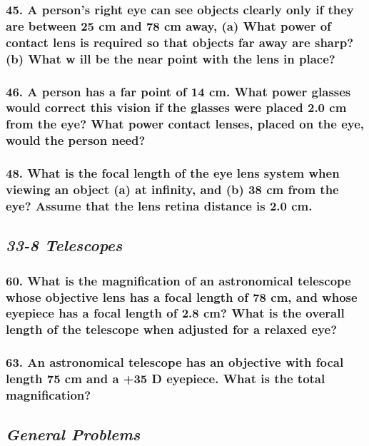 \documentclass{article}
\begin{document}
\subsubsection*{
    45. A person’s right eye can see objects clearly only if they are between 25 cm and 78 cm away, (a) What
    power of contact lens is required so that objects far away are sharp? (b) What w ill be the near point
    with the lens in place? 
}
\subsubsection*{
    46. A person has a far point of 14 cm. What power glasses would correct this vision if the glasses were
    placed 2.0 cm from the eye? What power contact lenses, placed on the eye, would the person need?
}
\subsubsection*{
    48. What is the focal length of the eye lens system when viewing an object (a) at infinity, and (b) 38 cm
    from the eye? Assume that the lens retina distance is 2.0 cm.
}
\newpage
\begin{center}
    \subsection*{\textbf{\textit{33-8 Telescopes}}}
\end{center}
\subsubsection*{
    60. What is the magnification of an astronomical telescope whose objective lens has a focal length of 78 cm,
    and whose eyepiece has a focal length of 2.8 cm? What is the overall length of the telescope when adjusted
    for a relaxed eye?
}
\subsubsection*{
    63. An astronomical telescope has an objective with focal length 75 cm and a +35 D eyepiece. What is the
    total magnification?
}
\newpage
\begin{center}
    \subsection*{\textbf{\textit{General Problems}}}
\end{center}
\end{document}
